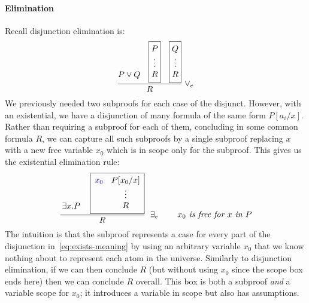  \paragraph{Elimination} Recall disjunction elimination is:
\begin{align*}
\setlength{\arraycolsep}{0em}
\dfrac{\begin{array}{c} \\ \\[0.7em] P \vee Q\end{array} \quad
\fbox{$\begin{array}{c} P \\ \vdots \\ R\end{array}$}
\quad
\fbox{$\begin{array}{c} Q \\ \vdots \\ R\end{array}$}}{R}
\;
{\vee_e}
\end{align*}
%
We previously needed two subproofs for each case of the disjunct.
However, with an existential, we have a disjunction of many formula
of the same form $P[a_i/x]$. Rather than requiring a subproof for
each of them, concluding in some common formula $R$, we can capture
all such subproofs by a single subproof replacing $x$ with a new
free variable $x_0$ which is in scope only for the subproof.
This gives us the existential elimination rule:
%
\begin{equation*}
\setlength{\arraycolsep}{0.2em}
\dfrac{\begin{array}{l} \\[2em] \exists x . P\end{array} \quad
\fbox{$\begin{array}{lc} \textcolor{blue}{x_0} \;\; & P[x_0/x]
         \\ &  \vdots \\ & R \end{array}$}}{R} \;\; {\exists_e}
   \qquad\; \textit{$x_0$ is free for $x$ in $P$}
\end{equation*}
%
The intuition is that the subproof represents a case for every
part of the disjunction in~\eqref{eq:exists-meaning} by using
an arbitrary variable $x_0$ that we know nothing about to represent
each atom in the universe. Similarly to disjunction elimination, if we
can then conclude $R$ (but without using $x_0$ since the scope box
ends here) then we can conclude $R$ overall. This box is
both a subproof \emph{and} a variable scope for $x_0$;  it introduces
a variable in scope but also has assumptions.

